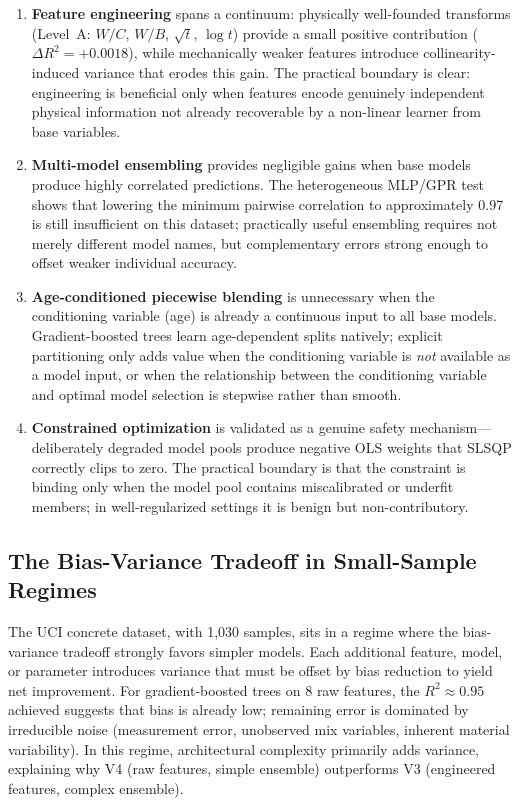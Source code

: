 \documentclass[journal]{IEEEtran}
\begin{document}
\begin{enumerate}
\item \textbf{Feature engineering} spans a continuum: physically well-founded transforms (Level~A: $W/C$, $W/B$, $\sqrt{t}$, $\log t$) provide a small positive contribution ($\Delta R^2 = +0.0018$), while mechanically weaker features introduce collinearity-induced variance that erodes this gain. The practical boundary is clear: engineering is beneficial only when features encode genuinely independent physical information not already recoverable by a non-linear learner from base variables.

\item \textbf{Multi-model ensembling} provides negligible gains when base models produce highly correlated predictions. The heterogeneous MLP/GPR test shows that lowering the minimum pairwise correlation to approximately 0.97 is still insufficient on this dataset; practically useful ensembling requires not merely different model names, but complementary errors strong enough to offset weaker individual accuracy.

\item \textbf{Age-conditioned piecewise blending} is unnecessary when the conditioning variable (age) is already a continuous input to all base models. Gradient-boosted trees learn age-dependent splits natively; explicit partitioning only adds value when the conditioning variable is \emph{not} available as a model input, or when the relationship between the conditioning variable and optimal model selection is stepwise rather than smooth.

\item \textbf{Constrained optimization} is validated as a genuine safety mechanism---deliberately degraded model pools produce negative OLS weights that SLSQP correctly clips to zero. The practical boundary is that the constraint is binding only when the model pool contains miscalibrated or underfit members; in well-regularized settings it is benign but non-contributory.
\end{enumerate}

\subsection{The Bias-Variance Tradeoff in Small-Sample Regimes}

The UCI concrete dataset, with 1{,}030 samples, sits in a regime where the bias-variance tradeoff strongly favors simpler models. Each additional feature, model, or parameter introduces variance that must be offset by bias reduction to yield net improvement. For gradient-boosted trees on 8 raw features, the $R^2 \approx 0.95$ achieved suggests that bias is already low; remaining error is dominated by irreducible noise (measurement error, unobserved mix variables, inherent material variability). In this regime, architectural complexity primarily adds variance, explaining why V4 (raw features, simple ensemble) outperforms V3 (engineered features, complex ensemble).
\end{document}
